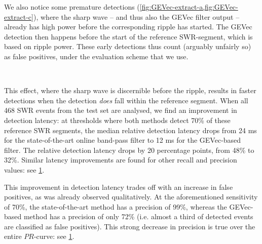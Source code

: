 We also notice some premature detections (\cref{fig:GEVec-extract-a,fig:GEVec-extract-c}), where the sharp wave -- and thus also the GEVec filter output -- already has high power before the corresponding ripple has started. The GEVec detection then happens before the start of the reference SWR-segment, which is based on ripple power. These early detections thus count (arguably unfairly so) as false positives, under the evaluation scheme that we use.

\begin{figure}
\\[2.5em]
\label{fig:LSM-PR-and-latency}
\end{figure}


This effect, where the sharp wave is discernible before the ripple, results in faster detections when the detection \emph{does} fall within the reference segment. When all 468 SWR events from the test set are analysed, we find an improvement in detection latency: at thresholds where both methods detect 70\% of these reference SWR segments, the median relative detection latency drops from 24 ms for the state-of-the-art online band-pass filter to 12 ms for the GEVec-based filter. The relative detection latency drops by 20 percentage points, from 48\% to 32\%. Similar latency improvements are found for other recall and precision values: see \cref{fig:LSM-PR-and-latency}.

This improvement in detection latency trades off with an increase in false positives, as was already observed qualitatively. At the aforementioned sensitivity of 70\%, the state-of-the-art method has a precision of 99\%, whereas the GEVec-based method has a precision of only 72\% (i.e. almost a third of detected events are classified as false positives). This strong decrease in precision is true over the entire $PR$-curve: see \cref{fig:LSM-PR-and-latency}.
